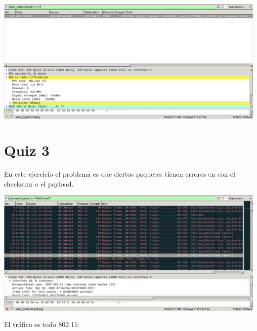\documentclass{article}
\begin{document}
\begin{center}
\includegraphics[scale=0.3]{WLAN/channel6.png} 
\end{center}

\section{Quiz 3}

En este ejercicio el problema es que ciertos paquetes tienen errores en con el checksum o el payload.

\begin{center}
\includegraphics[scale=0.3]{WLAN/malformed.png} 
\end{center}

El tráfico es todo 802.11:
\end{document}
